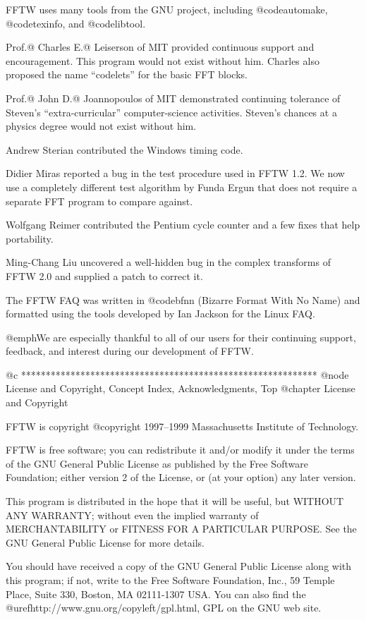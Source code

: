 FFTW uses many tools from the GNU project, including @code{automake},
@code{texinfo}, and @code{libtool}.

Prof.@ Charles E.@ Leiserson of MIT provided continuous support and
encouragement.  This program would not exist without him.  Charles also
proposed the name ``codelets'' for the basic FFT blocks.

Prof.@ John D.@ Joannopoulos of MIT demonstrated continuing tolerance of
Steven's ``extra-curricular'' computer-science activities.  Steven's
chances at a physics degree would not exist without him.

Andrew Sterian contributed the Windows timing code.  

Didier Miras reported a bug in the test procedure used in FFTW 1.2.  We
now use a completely different test algorithm by Funda Ergun that does
not require a separate FFT program to compare against.

Wolfgang Reimer contributed the Pentium cycle counter and a few fixes
that help portability.

Ming-Chang Liu uncovered a well-hidden bug in the complex transforms of
FFTW 2.0 and supplied a patch to correct it.

The FFTW FAQ was written in @code{bfnn} (Bizarre Format With No Name)
and formatted using the tools developed by Ian Jackson for the Linux
FAQ.

@emph{We are especially thankful to all of our users for their
continuing support, feedback, and interest during our development of
FFTW.}

@c ************************************************************
@node License and Copyright, Concept Index, Acknowledgments, Top
@chapter License and Copyright

FFTW is copyright @copyright{} 1997--1999 Massachusetts Institute of
Technology.

FFTW is free software; you can redistribute it and/or modify
it under the terms of the GNU General Public License as published by
the Free Software Foundation; either version 2 of the License, or
(at your option) any later version.

This program is distributed in the hope that it will be useful,
but WITHOUT ANY WARRANTY; without even the implied warranty of
MERCHANTABILITY or FITNESS FOR A PARTICULAR PURPOSE.  See the
GNU General Public License for more details.

You should have received a copy of the GNU General Public License along
with this program; if not, write to the Free Software Foundation, Inc.,
59 Temple Place, Suite 330, Boston, MA 02111-1307 USA.  You can also
find the @uref{http://www.gnu.org/copyleft/gpl.html, GPL on the GNU web
site}.

